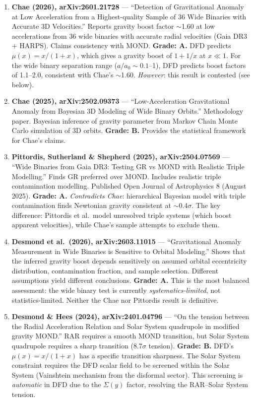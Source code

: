 \documentclass[11pt,a4paper]{article}
\begin{document}
\begin{enumerate}

\item \textbf{Chae (2026), arXiv:2601.21728} --- ``Detection of Gravitational Anomaly at Low Acceleration from a Highest-quality Sample of 36 Wide Binaries with Accurate 3D Velocities.'' Reports gravity boost factor $\sim$1.60 at low accelerations from 36 wide binaries with accurate radial velocities (Gaia DR3 + HARPS). Claims consistency with MOND. \textbf{Grade: A.} DFD predicts $\mu(x) = x/(1+x)$, which gives a gravity boost of $1 + 1/x$ at $x \ll 1$. For the wide binary separation range ($a/a_0 \sim 0.1$--1), DFD predicts boost factors of 1.1--2.0, consistent with Chae's $\sim$1.60. \emph{However}: this result is contested (see below).

\item \textbf{Chae (2025), arXiv:2502.09373} --- ``Low-Acceleration Gravitational Anomaly from Bayesian 3D Modeling of Wide Binary Orbits.'' Methodology paper. Bayesian inference of gravity parameter from Markov Chain Monte Carlo simulation of 3D orbits. \textbf{Grade: B.} Provides the statistical framework for Chae's claims.

\item \textbf{Pittordis, Sutherland \& Shepherd (2025), arXiv:2504.07569} --- ``Wide Binaries from Gaia DR3: Testing GR vs MOND with Realistic Triple Modelling.'' Finds GR preferred over MOND. Includes realistic triple contamination modelling. Published Open Journal of Astrophysics 8 (August 2025). \textbf{Grade: A.} \emph{Contradicts Chae}: hierarchical Bayesian model with triple contamination finds Newtonian gravity consistent at $\sim$0.4$\sigma$. The key difference: Pittordis et al.\ model unresolved triple systems (which boost apparent velocities), while Chae's sample attempts to exclude them.

\item \textbf{Desmond et al.\ (2026), arXiv:2603.11015} --- ``Gravitational Anomaly Measurement in Wide Binaries is Sensitive to Orbital Modeling.'' Shows that the inferred gravity boost depends sensitively on assumed orbital eccentricity distribution, contamination fraction, and sample selection. Different assumptions yield different conclusions. \textbf{Grade: A.} This is the most balanced assessment: the wide binary test is currently \emph{systematics-limited}, not statistics-limited. Neither the Chae nor Pittordis result is definitive.

\item \textbf{Desmond \& Hees (2024), arXiv:2401.04796} --- ``On the tension between the Radial Acceleration Relation and Solar System quadrupole in modified gravity MOND.'' RAR requires a smooth MOND transition, but Solar System quadrupole requires a sharp transition ($8.7\sigma$ tension). \textbf{Grade: B.} DFD's $\mu(x) = x/(1+x)$ has a specific transition sharpness. The Solar System constraint requires the DFD scalar field to be screened within the Solar System (Vainshtein mechanism from the disformal sector). This screening is \emph{automatic} in DFD due to the $\Sigma(y)$ factor, resolving the RAR--Solar System tension.

\end{enumerate}
\end{document}
